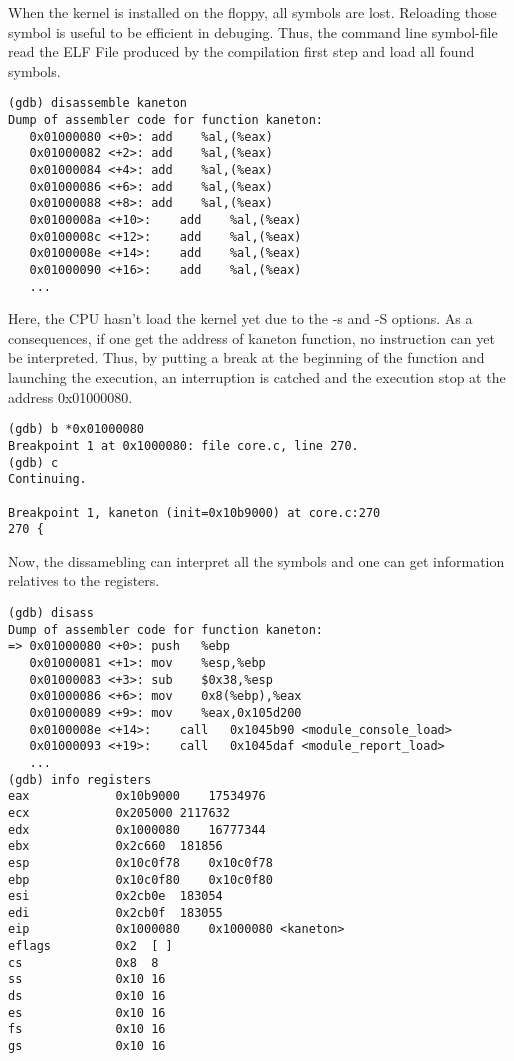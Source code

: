 When the kernel is installed on the floppy, all symbols are lost. Reloading those symbol is useful to be efficient in debuging. Thus, the command line symbol-file read the ELF File produced by the compilation first step and load all found symbols.

\begin{verbatim}
(gdb) disassemble kaneton
Dump of assembler code for function kaneton:
   0x01000080 <+0>:	add    %al,(%eax)
   0x01000082 <+2>:	add    %al,(%eax)
   0x01000084 <+4>:	add    %al,(%eax)
   0x01000086 <+6>:	add    %al,(%eax)
   0x01000088 <+8>:	add    %al,(%eax)
   0x0100008a <+10>:	add    %al,(%eax)
   0x0100008c <+12>:	add    %al,(%eax)
   0x0100008e <+14>:	add    %al,(%eax)
   0x01000090 <+16>:	add    %al,(%eax)
   ...
\end{verbatim}
Here, the CPU hasn't load the kernel yet due to the -s and -S options. As a consequences, if one get the address of kaneton function, no instruction can yet be interpreted. Thus, by putting a break at the beginning of the function and launching the execution, an interruption is catched and the execution stop at the address 0x01000080.

\begin{verbatim}
(gdb) b *0x01000080
Breakpoint 1 at 0x1000080: file core.c, line 270.
(gdb) c
Continuing.

Breakpoint 1, kaneton (init=0x10b9000) at core.c:270
270	{
\end{verbatim}

Now, the dissamebling can interpret all the symbols and one can get information relatives to the registers.

\begin{verbatim}
(gdb) disass
Dump of assembler code for function kaneton:
=> 0x01000080 <+0>:	push   %ebp
   0x01000081 <+1>:	mov    %esp,%ebp
   0x01000083 <+3>:	sub    $0x38,%esp
   0x01000086 <+6>:	mov    0x8(%ebp),%eax
   0x01000089 <+9>:	mov    %eax,0x105d200
   0x0100008e <+14>:	call   0x1045b90 <module_console_load>
   0x01000093 <+19>:	call   0x1045daf <module_report_load>
   ...
(gdb) info registers
eax            0x10b9000	17534976
ecx            0x205000	2117632
edx            0x1000080	16777344
ebx            0x2c660	181856
esp            0x10c0f78	0x10c0f78
ebp            0x10c0f80	0x10c0f80
esi            0x2cb0e	183054
edi            0x2cb0f	183055
eip            0x1000080	0x1000080 <kaneton>
eflags         0x2	[ ]
cs             0x8	8
ss             0x10	16
ds             0x10	16
es             0x10	16
fs             0x10	16
gs             0x10	16
\end{verbatim}
